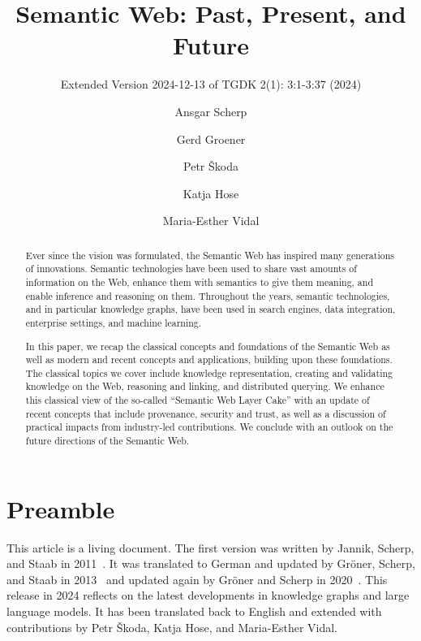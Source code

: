 \documentclass[a4paper,USenglish]{tgdk-v2021}
\author{Ansgar Scherp}{Ulm University, Germany \and \url{http://ansgarscherp.net}}{ansgar.scherp@uni-ulm.de}{https://orcid.org/0000-0002-2653-9245}{}
\author{Gerd Groener}{Carl Zeiss SMT GmbH, Germany \and
\url{http://www.gerd-groener.de}}{gerd.groener@gmx.de}{https://orcid.org/0009-0002-0259-9769}{}{}
\author{Petr \v{S}koda}{Department of Software Engineering, Faculty of Mathematics and Physics, Charles University, Prague, Czechia}{petr.skoda@matfyz.cuni.cz}{https://orcid.org/0000-0002-2732-9370}{}
\author{Katja Hose}{TU Wien, Austria \and \url{http://www.katja-hose.de}}{katja.hose@tuwien.ac.at} {https://orcid.org/0000-0001-7025-8099}{}
\author{Maria-Esther Vidal}{Leibniz University of Hannover and TIB-Leibniz Information Centre for Science and Technology, Germany}{maria.vidal@tib.eu}{https://orcid.org/0000-0003-1160-8727}{Partially funded by Leibniz Association, program "Leibniz Best Minds: Programme for Women Professors", project TrustKG-Transforming Data in Trustable Insights; Grant P99/2020}
\begin{document}
\title{Semantic Web: Past, Present, and Future}
\subtitle{Extended Version 2024-12-13 of TGDK 2(1): 3:1-3:37 (2024)}
\maketitle


\begin{abstract}

Ever since the vision was formulated, the Semantic Web has inspired many generations of innovations.
Semantic technologies have been used to share vast amounts of information on the Web, enhance them with semantics to give them meaning, and enable inference and reasoning on them. 
Throughout the years, semantic technologies, and in particular knowledge graphs, have been used in search engines, data integration, enterprise settings, and machine learning.

In this paper, we recap the classical concepts and foundations of the Semantic Web as well as modern and recent concepts and applications, building upon these foundations. 
The classical topics we cover include knowledge representation, creating and validating knowledge on the Web, reasoning and linking, and distributed querying.
We enhance this classical view of the so-called ``Semantic Web Layer Cake'' with an update of recent concepts that include provenance, security and trust, as well as a discussion of practical impacts from industry-led contributions.
We conclude with an outlook on the future directions of the Semantic Web.

\end{abstract}

\clearpage

\section*{Preamble}

This article is a living document.
The first version was written by Jannik, Scherp, and Staab in 2011~\cite{DBLP:journals/insk/JanikSS11}.
It was translated to German and updated by Gröner, Scherp, and Staab in 2013~\cite{DBLP:books/ol/13/GronerSS13} and updated again by Gröner and Scherp in 2020~\cite{DBLP:books/degruyter/20/ScherpG20}.
This release in 2024 reflects on the latest developments in knowledge graphs and large language models.
It has been translated back to English and extended with contributions by Petr \v{S}koda, Katja Hose, and Maria-Esther Vidal.	
\end{document}
